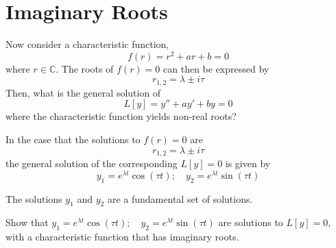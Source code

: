 \documentclass[twoside]{report}
\begin{document}
    \section{Imaginary Roots}
    Now consider a characteristic function,
    \begin{equation}
        f(r) = r^{2} + ar + b = 0
    \end{equation}
    where $r \in \mathbb{C}$. The roots of $f(r) = 0$ can then be expressed by
    \begin{equation}
        r_{1,2} = \lambda \pm i\tau
    \end{equation}
    Then, what is the general solution of
    \begin{equation}
        L[y] = y'' + ay' + by = 0
    \end{equation}
    where the characteristic function yields non-real roots?
    \begin{btheorem}
        In the case that the solutions to $f(r) = 0$ are
        \begin{equation}
            r_{1,2} = \lambda \pm i\tau
        \end{equation}
        the general solution of the corresponding $L[y] = 0$ is given by
        \begin{equation}
            y_{1} = e^{\lambda t}\cos(\tau t);\quad y_{2} = e^{\lambda t}\sin(\tau t)
        \end{equation}
        
        The solutions $y_{1}$ and $y_{2}$ are a fundamental set of solutions.
    \end{btheorem}
    \begin{homework}
        Show that $y_{1} = e^{\lambda t}\cos(\tau t);\quad y_{2} = e^{\lambda t}\sin(\tau t)$ are solutions to $L[y] = 0$, with a characteristic function that has imaginary roots.
    \end{homework}
\end{document}

